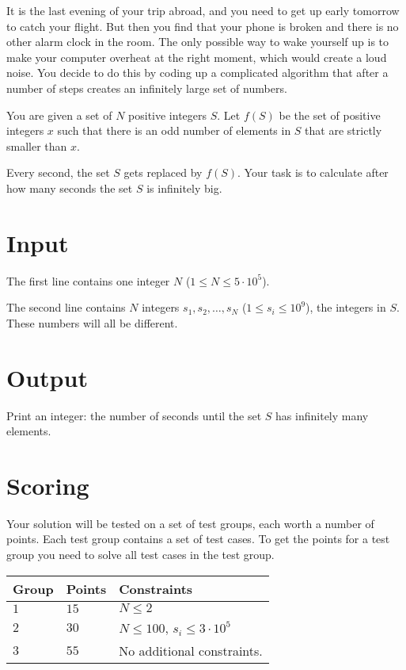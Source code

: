 
It is the last evening of your trip abroad, and you need to get up early tomorrow
to catch your flight. But then you find that your phone is broken and there is no 
other alarm clock in the room. The only possible way to wake yourself up is to make 
your computer overheat at the right moment, which would create a loud noise. You decide 
to do this by coding up a complicated algorithm that after a number of steps creates an 
infinitely large set of numbers.


You are given a set of $N$ positive integers $S$. Let $f(S)$ be the set of positive integers $x$ such 
that there is an odd number of elements in $S$ that are strictly smaller than $x$.

Every second, the set $S$ gets replaced by $f(S)$. Your task is to calculate after
how many seconds the set $S$ is infinitely big.

\section*{Input}
The first line contains one integer $N$ ($1 \leq N \leq 5 \cdot 10^5$).

The second line contains $N$ integers $s_1, s_2, \dots, s_N$ ($1 \leq s_i \leq 10^9$), 
the integers in $S$. These numbers will all be different.

\section*{Output}
Print an integer: the number of seconds until the set $S$ has infinitely many elements.

\section*{Scoring}
Your solution will be tested on a set of test groups, each worth a number of points. Each test group contains
a set of test cases. To get the points for a test group you need to solve all test cases in the test group.

\noindent
\begin{tabular}{| l | l | p{12cm} |}
  \hline
  \textbf{Group} & \textbf{Points} & \textbf{Constraints} \\ \hline
  $1$    & $15$       & $N \leq 2$ \\ \hline
  $2$    & $30$       & $N \leq 100$, $s_i \leq 3 \cdot 10^5$ \\ \hline
  $3$    & $55$       & No additional constraints. \\ \hline
\end{tabular}
